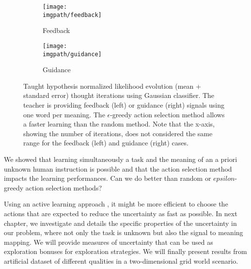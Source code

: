 \begin{figure}[!htbp]
  \centering
  \begin{subfigure}[b]{0.49\columnwidth}
    \centering
    \texttt{[image: \\imgpath/feedback]}
    \caption{Feedback}
  \end{subfigure}
  \begin{subfigure}[b]{0.49\columnwidth}
    \centering
    \texttt{[image: \\imgpath/guidance]}
    \caption{Guidance}
  \end{subfigure}
  \caption{Taught hypothesis normalized likelihood evolution (mean + standard error) thought iterations using Gaussian classifier. The teacher is providing feedback (left) or guidance (right) signals using one word per meaning. The $\epsilon$-greedy action selection method allows a faster learning than the random method. Note that the x-axis, showing the number of iterations, does not considered the same range for the feedback (left) and guidance (right) cases.}
  \label{fig:selectionMethod}
\end{figure}

\transition

We showed that learning simultaneously a task and the meaning of an a priori unknown human instruction is possible and that the action selection method impacts the learning performances. Can we do better than random or $epsilon$-greedy action selection methods?


Using an active learning approach \cite{settles2010active}, it might be more efficient to choose the actions that are expected to reduce the uncertainty as fast as possible. In next chapter, we investigate and details the specific properties of the uncertainty in our problem, where not only the task is unknown but also the signal to meaning mapping. We will provide measures of uncertainty that can be used as exploration bonuses for exploration strategies. We will finally present results from artificial dataset of different qualities in a two-dimensional grid world scenario.


